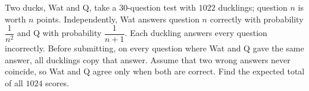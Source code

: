 Two ducks, Wat and Q, take a $30$-question test with $1022$ ducklings; question $n$ is worth $n$ points. Independently, Wat answers question $n$ correctly with probability $\dfrac1{n^2}$ and Q with probability $\dfrac1{n+1}$. Each duckling answers every question incorrectly. Before submitting, on every question where Wat and Q gave the same answer, all ducklings copy that answer. Assume that two wrong answers never coincide, so Wat and Q agree only when both are correct. Find the expected total of all $1024$ scores.
